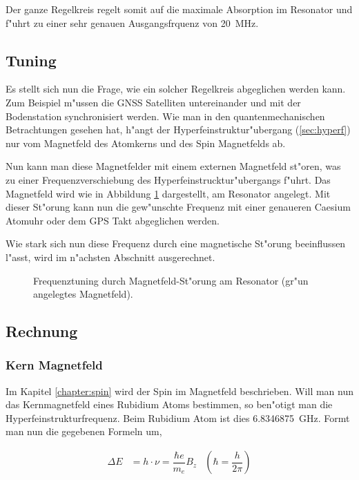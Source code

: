 \begin{refsection}
Der ganze Regelkreis regelt somit auf die maximale Absorption im
Resonator und f"uhrt zu einer sehr genauen Ausgangsfrquenz von
\SI{20}{\mega\hertz}.

\subsection{Tuning}
Es stellt sich nun die Frage, wie ein solcher Regelkreis abgeglichen
werden kann.  Zum Beispiel m"ussen die GNSS Satelliten untereinander
und mit der Bodenstation synchronisiert werden.  Wie man in den
quantenmechanischen Betrachtungen gesehen hat, h"angt der
Hyperfeinstruktur"ubergang (\ref{sec:hyperf}) nur vom Magnetfeld des
Atomkerns und des Spin Magnetfelds ab.

Nun kann man diese Magnetfelder mit einem externen Magnetfeld st"oren,
was zu einer Frequenzverschiebung des Hyperfeinstrucktur"ubergangs
f"uhrt.  Das Magnetfeld wird wie in Abbildung \ref{fig:tuning}
dargestellt, am Resonator angelegt.  Mit dieser St"orung kann nun die
gew"unschte Frequenz mit einer genaueren Caesium Atomuhr oder dem GPS
Takt abgeglichen werden.

Wie stark sich nun diese Frequenz durch eine magnetische St"orung
beeinflussen l"asst, wird im n"achsten Abschnitt ausgerechnet.

\begin{figure}
  \centering
  
  \caption{Frequenztuning durch Magnetfeld-St"orung am Resonator
    (gr"un angelegtes Magnetfeld).}
  \label{fig:tuning}
\end{figure}

\subsection{Rechnung}

\subsubsection{Kern Magnetfeld}
Im Kapitel \ref{chapter:spin} wird der Spin im Magnetfeld beschrieben.
Will man nun das Kernmagnetfeld eines Rubidium Atoms bestimmen, so
ben"otigt man die Hyperfeinstrukturfrequenz.  Beim Rubidium Atom ist
dies \SI{6.8346875}{\giga\hertz}.  Formt man nun die gegebenen Formeln
um,

\begin{align*}
  \Delta E &= h\cdot\nu = \dfrac{\hbar e}{m_e}B_z
           &\left(\hbar = \dfrac{h}{2\pi}\right)
\end{align*}


\end{refsection}
